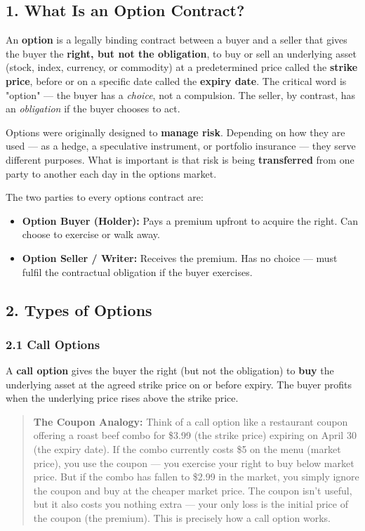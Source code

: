 \documentclass[12pt,openany]{book}
\begin{document}
\subsection{1. What Is an Option Contract?}

An \textbf{option} is a legally binding contract between a buyer and a seller that gives the buyer the \textbf{right, but not the obligation}, to buy or sell an underlying asset (stock, index, currency, or commodity) at a predetermined price called the \textbf{strike price}, before or on a specific date called the \textbf{expiry date}. The critical word is "option" — the buyer has a \emph{choice}, not a compulsion. The seller, by contrast, has an \emph{obligation} if the buyer chooses to act.

Options were originally designed to \textbf{manage risk}. Depending on how they are used — as a hedge, a speculative instrument, or portfolio insurance — they serve different purposes. What is important is that risk is being \textbf{transferred} from one party to another each day in the options market.

The two parties to every options contract are:

\begin{itemize}[leftmargin=*]
    \item \textbf{Option Buyer (Holder):} Pays a premium upfront to acquire the right. Can choose to exercise or walk away.
    \item \textbf{Option Seller / Writer:} Receives the premium. Has no choice — must fulfil the contractual obligation if the buyer exercises.
\end{itemize}


\subsection{2. Types of Options}

\subsubsection{2.1 Call Options}

A \textbf{call option} gives the buyer the right (but not the obligation) to \textbf{buy} the underlying asset at the agreed strike price on or before expiry. The buyer profits when the underlying price rises above the strike price.

\begin{quote}
\textbf{The Coupon Analogy:} Think of a call option like a restaurant coupon offering a roast beef combo for \$3.99 (the strike price) expiring on April 30 (the expiry date). If the combo currently costs \$5 on the menu (market price), you use the coupon — you exercise your right to buy below market price. But if the combo has fallen to \$2.99 in the market, you simply ignore the coupon and buy at the cheaper market price. The coupon isn't useful, but it also costs you nothing extra — your only loss is the initial price of the coupon (the premium). This is precisely how a call option works.
\end{quote}
\end{document}
